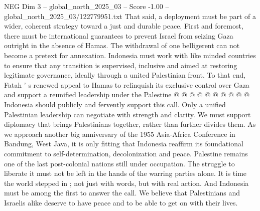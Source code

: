 \begin{textsample}{NEG Dim 3 – global\_north\_2025\_03 – Score -1.00 – global\_north\_2025\_03/122779951.txt}
That said, a deployment must be part of a wider, coherent strategy toward a just and durable peace.
First and foremost, there must be international guarantees to prevent Israel from seizing Gaza outright in the absence of Hamas.
The withdrawal of one belligerent can not become a pretext for annexation.
Indonesia must work with like minded countries to ensure that any transition is supervised, inclusive and aimed at restoring legitimate governance, ideally through a united Palestinian front.
To that end, Fatah ' s renewed appeal to Hamas to relinquish its exclusive control over Gaza and support a reunified leadership under the Palestine @ @ @ @ @ @ @ @ @ @ Indonesia should publicly and fervently support this call.
Only a unified Palestinian leadership can negotiate with strength and clarity.
We must support diplomacy that brings Palestinians together, rather than further divides them.
As we approach another big anniversary of the 1955 Asia-Africa Conference in Bandung, West Java, it is only fitting that Indonesia reaffirm its foundational commitment to self-determination, decolonization and peace.
Palestine remains one of the last post-colonial nations still under occupation.
The struggle to liberate it must not be left in the hands of the warring parties alone.
It is time the world stepped in ; not just with words, but with real action.
And Indonesia must be among the first to answer the call.
We believe that Palestinians and Israelis alike deserve to have peace and to be able to get on with their lives.

\end{textsample}
